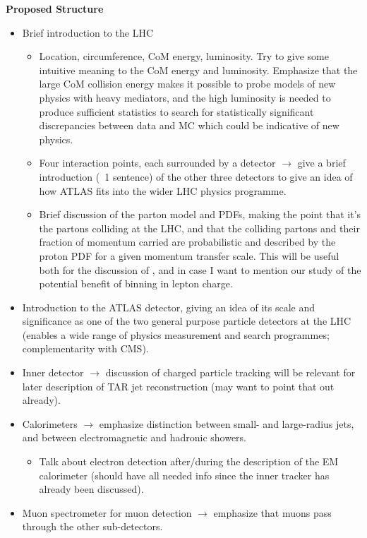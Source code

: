\begin{description}
\textbf{Proposed Structure}
\begin{itemize}
\item Brief introduction to the LHC
\begin{itemize}
\item Location, circumference, CoM energy, luminosity. Try to give some intuitive meaning to the CoM energy and luminosity. Emphasize that the large CoM collision energy makes it possible to probe models of new physics with heavy mediators, and the high luminosity is needed to produce sufficient statistics to search for statistically significant discrepancies between data and MC which could be indicative of new physics. 
\item Four interaction points, each surrounded by a detector $\rightarrow$ give a brief introduction (~1 sentence) of the other three detectors to give an idea of how ATLAS fits into the wider LHC physics programme.
\item Brief discussion of the parton model and PDFs, making the point that it's the partons colliding at the LHC, and that the colliding partons and their fraction of momentum carried are probabilistic and described by the proton PDF for a given momentum transfer scale. This will be useful both for the discussion of \met, and in case I want to mention our study of the potential benefit of binning in lepton charge.
\end{itemize}
\item Introduction to the ATLAS detector, giving an idea of its scale and significance as one of the two general purpose particle detectors at the LHC (enables a wide range of physics measurement and search programmes; complementarity with CMS).
\item Inner detector $\rightarrow$ discussion of charged particle tracking will be relevant for later description of TAR jet reconstruction (may want to point that out already).
\item Calorimeters $\rightarrow$ emphasize distinction between small- and large-radius jets, and between electromagnetic and hadronic showers. 
\begin{itemize}
\item Talk about electron detection after/during the description of the EM calorimeter (should have all needed info since the inner tracker has already been discussed). 
\end{itemize}
\item Muon spectrometer for muon detection $\rightarrow$ emphasize that muons pass through the other sub-detectors. 

\end{itemize}
\end{description}
